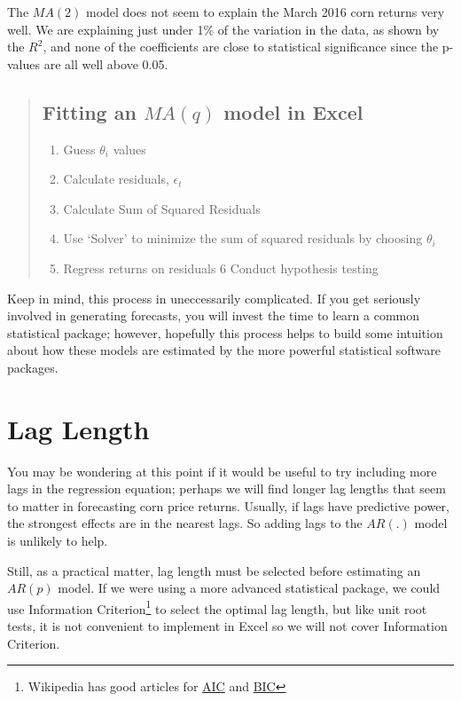 \documentclass[
  letterpaper,
  DIV=11,
  numbers=noendperiod]{scrreprt}
\providecommand{\tightlist}{%
  \setlength{\itemsep}{0pt}\setlength{\parskip}{0pt}}\usepackage{longtable,booktabs,array}
\begin{document}
The \(MA(2)\) model does not seem to explain the March 2016 corn returns
very well. We are explaining just under 1\% of the variation in the
data, as shown by the \(R^2\), and none of the coefficients are close to
statistical significance since the p-values are all well above 0.05.

\begin{quote}
\subsection{\texorpdfstring{Fitting an \(MA(q)\) model in
Excel}{Fitting an MA(q) model in Excel}}\label{fitting-an-maq-model-in-excel}

\begin{enumerate}
\def\labelenumi{\arabic{enumi}.}
\tightlist
\item
  Guess \(\theta_i\) values
\item
  Calculate residuals, \(\epsilon_t\)
\item
  Calculate Sum of Squared Residuals
\item
  Use `Solver' to minimize the sum of squared residuals by choosing
  \(\theta_i\)
\item
  Regress returns on residuals 6 Conduct hypothesis testing
\end{enumerate}
\end{quote}

Keep in mind, this process in uneccessarily complicated. If you get
seriously involved in generating forecasts, you will invest the time to
learn a common statistical package; however, hopefully this process
helps to build some intuition about how these models are estimated by
the more powerful statistical software packages.

\section{Lag Length}\label{lag-length}

You may be wondering at this point if it would be useful to try
including more lags in the regression equation; perhaps we will find
longer lag lengths that seem to matter in forecasting corn price
returns. Usually, if lags have predictive power, the strongest effects
are in the nearest lags. So adding lags to the \(AR(.)\) model is
unlikely to help.

Still, as a practical matter, lag length must be selected before
estimating an \(AR(p)\) model. If we were using a more advanced
statistical package, we could use Information Criterion\footnote{Wikipedia
  has good articles for
  \href{https://en.wikipedia.org/wiki/Akaike_information_criterion}{AIC}
  and
  \href{https://en.wikipedia.org/wiki/Bayesian_information_criterion}{BIC}}
to select the optimal lag length, but like unit root tests, it is not
convenient to implement in Excel so we will not cover Information
Criterion.
\end{document}
